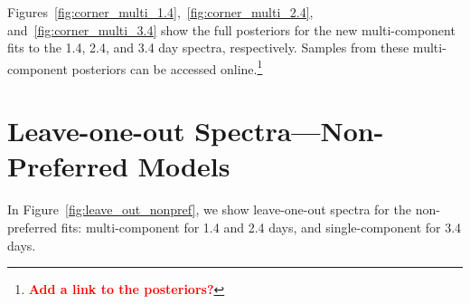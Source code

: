 \documentclass[twocolumn, twocolappendix]{aastex63}
\def\SPARK{\texttt{SPARK}}
\newcommand\redbf[1]{\textbf{\textcolor{red}{#1}}}
\begin{document}
Figures~\ref{fig:corner_multi_1.4},~\ref{fig:corner_multi_2.4}, and~\ref{fig:corner_multi_3.4} show the full posteriors for the new multi-component fits to the 1.4, 2.4, and 3.4 day spectra, respectively. Samples from these multi-component posteriors can be accessed online.\footnote{\redbf{Add a link to the posteriors?}}







\section{Leave-one-out Spectra---Non-Preferred Models}\label{app:leave_out_multi}

In Figure~\ref{fig:leave_out_nonpref}, we show leave-one-out spectra for the non-preferred fits: multi-component for 1.4 and 2.4 days, and single-component for 3.4 days.
\end{document}
